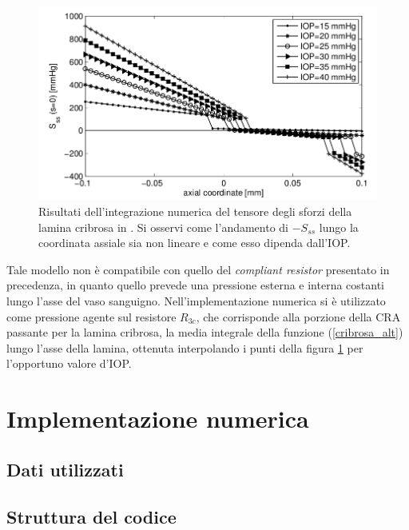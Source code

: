 \documentclass{article}
\begin{document}
\begin{figure}[h]
\begin{center}
\includegraphics[width=1.0\textwidth]{Pictures/riscribrosa.png}
\caption{Risultati dell'integrazione numerica del tensore degli sforzi della lamina cribrosa in \cite{art3}. Si osservi come l'andamento di $-S_{ss}$ lungo la coordinata assiale sia non lineare e come esso dipenda dall'IOP.}
\label{riscribrosa}
\end{center}
\end{figure}

Tale modello non è compatibile con quello del \textit{compliant resistor} presentato in precedenza, in quanto quello prevede una pressione esterna e interna costanti lungo l'asse del vaso sanguigno.
Nell'implementazione numerica si è utilizzato come pressione agente sul resistore $R_{3c}$, che corrisponde alla porzione della CRA passante per la lamina cribrosa, la media integrale della funzione (\ref{cribrosa_alt}) lungo l'asse della lamina, ottenuta interpolando i punti della figura \ref{riscribrosa} per l'opportuno valore d'IOP.

\section{Implementazione numerica}
\subsection{Dati utilizzati}
\subsection{Struttura del codice}
\end{document}
